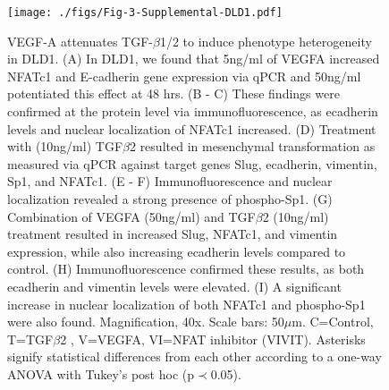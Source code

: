 \begin{figure}
\texttt{[image: ./figs/Fig-3-Supplemental-DLD1.pdf]}
\caption{VEGF-A attenuates TGF-$\beta$1/2 to induce phenotype heterogeneity in DLD1.
(A) In DLD1, we found that 5ng/ml of VEGFA increased NFATc1 and E-cadherin gene expression via qPCR and 50ng/ml potentiated this effect at 48 hrs.
(B - C) These findings were confirmed at the protein level via immunofluorescence, as ecadherin levels and nuclear localization of NFATc1 increased.
(D) Treatment with (10ng/ml) TGF$\beta$2 resulted in mesenchymal transformation as measured via qPCR against target genes Slug, ecadherin, vimentin, Sp1, and NFATc1.
(E - F) Immunofluorescence and nuclear localization revealed a strong presence of phospho-Sp1.
(G) Combination of VEGFA (50ng/ml) and TGF$\beta$2 (10ng/ml) treatment resulted in increased Slug, NFATc1, and vimentin expression, while also increasing ecadherin levels compared to control.
(H) Immunofluorescence confirmed these results, as both ecadherin and vimentin levels were elevated.
(I) A significant increase in nuclear localization of both NFATc1 and phospho-Sp1 were also found.
Magnification, 40x. Scale bars: 50$\mu$m.  C=Control, T=TGF$\beta$2 , V=VEGFA, VI=NFAT inhibitor (VIVIT).
Asterisks signify statistical differences from each other according to a one-way ANOVA with Tukey's post hoc (p$\prec$0.05).}\label{fg:S3}
\end{figure}

